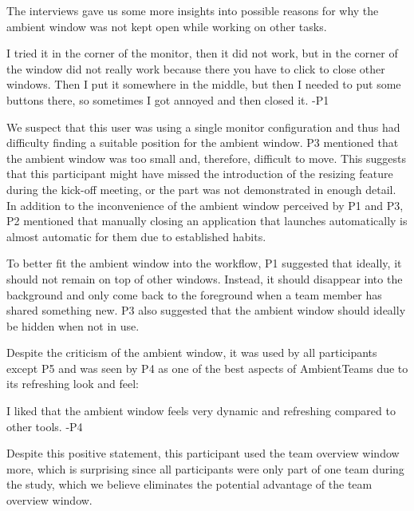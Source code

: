 The interviews gave us some more insights into possible reasons for why the ambient window was not kept open while working on other tasks.

\begin{displayquote}
    I tried it in the corner of the monitor, then it did not work, but in the corner of the window did not really work because there you have to click to close other windows. Then I put it somewhere in the middle, but then I needed to put some buttons there, so sometimes I got annoyed and then closed it. -P1
\end{displayquote}

We suspect that this user was using a single monitor configuration and thus had difficulty finding a suitable position for the ambient window. P3 mentioned that the ambient window was too small and, therefore, difficult to move. This suggests that this participant might have missed the introduction of the resizing feature during the kick-off meeting, or the part was not demonstrated in enough detail. In addition to the inconvenience of the ambient window perceived by P1 and P3, P2 mentioned that manually closing an application that launches automatically is almost automatic for them due to established habits. 

To better fit the ambient window into the workflow, P1 suggested that ideally, it should not remain on top of other windows. Instead, it should disappear into the background and only come back to the foreground when a team member has shared something new. P3 also suggested that the ambient window should ideally be hidden when not in use.

Despite the criticism of the ambient window, it was used by all participants except P5 and was seen by P4 as one of the best aspects of AmbientTeams due to its refreshing look and feel:

\begin{displayquote}
    I liked that the ambient window feels very dynamic and refreshing compared to other tools. -P4
\end{displayquote}

Despite this positive statement, this participant used the team overview window more, which is surprising since all participants were only part of one team during the study, which we believe eliminates the potential advantage of the team overview window. 

